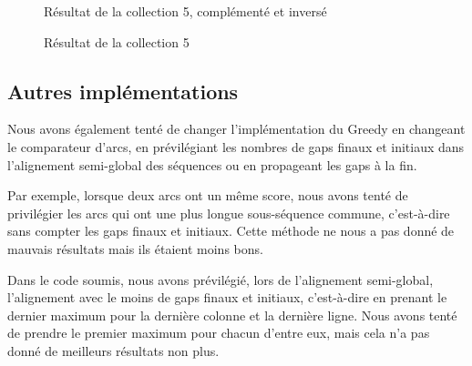 \begin{figure}[!ht]
\begin{minipage}[c]{.46 \linewidth}
\begin{center}
			Résultat de la collection 5, complémenté et inversé
		\end{center}
	\end{minipage}
	\caption{Résultat de la collection 5}
\end{figure}



\FloatBarrier

\subsection{Autres implémentations}

Nous avons également tenté de changer l'implémentation du Greedy en changeant
le comparateur d'arcs, en prévilégiant les nombres de gaps finaux et initiaux
dans l'alignement semi-global des séquences ou en propageant les gaps à la fin.

Par exemple, lorsque deux arcs ont un même score, nous avons tenté de
privilégier les arcs qui ont une plus longue sous-séquence commune, c'est-à-dire
sans compter les gaps finaux et initiaux. Cette méthode ne nous a pas donné de
mauvais résultats mais ils étaient moins bons.

Dans le code soumis, nous avons prévilégié, lors de l'alignement semi-global,
l'alignement avec le moins de gaps finaux et initiaux, c'est-à-dire en
prenant le dernier maximum pour la dernière colonne et la dernière ligne. Nous
avons tenté de prendre le premier maximum pour chacun d'entre eux, mais cela n'a
pas donné de meilleurs résultats non plus.

